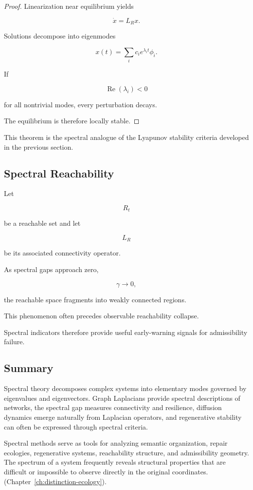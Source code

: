 \documentclass[12pt,twoside,openright]{book}
\begin{document}
\begin{proof}
Linearization near equilibrium yields

\[
\dot x
=

L_Rx.
\]

Solutions decompose into eigenmodes

\[
x(t)
=

\sum_i
c_i
e^{\lambda_i t}
\phi_i.
\]

If

\[
\operatorname{Re}(\lambda_i)<0
\]

for all nontrivial modes, every perturbation decays.

The equilibrium is therefore locally stable.
\end{proof}

This theorem is the spectral analogue of the Lyapunov
stability criteria developed in the previous section.

\subsection{Spectral Reachability}

Let

\[
R_t
\]

be a reachable set and let

\[
L_R
\]

be its associated connectivity operator.

As spectral gaps approach zero,

\[
\gamma\rightarrow0,
\]

the reachable space fragments into weakly connected
regions.

This phenomenon often precedes observable reachability
collapse.

Spectral indicators therefore provide useful early-warning
signals for admissibility failure.

\subsection{Summary}

Spectral theory decomposes complex systems into
elementary modes governed by eigenvalues and
eigenvectors. Graph Laplacians provide spectral
descriptions of networks, the spectral gap measures
connectivity and resilience, diffusion dynamics emerge
naturally from Laplacian operators, and regenerative
stability can often be expressed through spectral
criteria.

Spectral methods serve as tools for analyzing semantic organization,
repair ecologies, regenerative systems, reachability
structure, and admissibility geometry. The spectrum of a
system frequently reveals structural properties that are
difficult or impossible to observe directly in the
original coordinates.
(Chapter~\ref{ch:distinction-ecology}).
\end{document}
